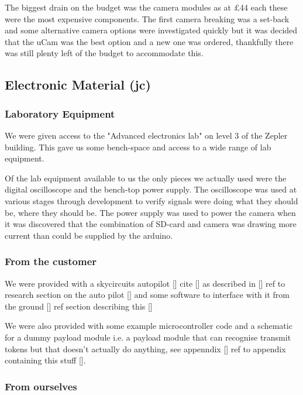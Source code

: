 The biggest drain on the budget was the camera modules as at \pounds 44 each these were the most expensive components. The first camera breaking was a set-back and some alternative camera options were investigated quickly but it was decided that the uCam was the best option and a new one was ordered, thankfully there was still plenty left of the budget to accommodate this.

\subsection{Electronic Material (jc)}

\subsubsection{Laboratory Equipment}

We were given access to the "Advanced electronics lab" on level 3 of the Zepler building. This gave us some bench-space and access to a wide range of lab equipment.

Of the lab equipment available to us the only pieces we actually used were the digital oscilloscope and the bench-top power supply. The oscilloscope was used at various stages through development to verify signals were doing what they should be, where they should be. The power supply was used to power the camera when it was discovered that the combination of SD-card and camera was drawing more current than could be supplied by the arduino.

\subsubsection{From the customer}

We were provided with a skycircuits autopilot [] cite [] as described in [] ref to research section on the auto pilot [] and some software to interface with it from the ground [] ref section describing this []

We were also provided with some example microcontroller code and a schematic for a dummy payload module i.e. a payload module that can recognise transmit tokens but that doesn't actually do anything, see appenndix [] ref to appendix containing this stuff [].

\subsubsection{From ourselves}


